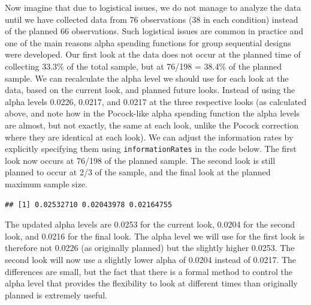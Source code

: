 \documentclass[
  oneside]{krantz}
\makeatletter
\newenvironment{Shaded}{\begin{snugshade}}{\end{snugshade}}
\newcommand{\AttributeTok}[1]{\textcolor[rgb]{0.61,0.61,0.61}{#1}}
\newcommand{\DecValTok}[1]{\textcolor[rgb]{0.06,0.06,0.06}{#1}}
\newcommand{\FloatTok}[1]{\textcolor[rgb]{0.06,0.06,0.06}{#1}}
\newcommand{\FunctionTok}[1]{\textcolor[rgb]{0,0,0}{#1}}
\newcommand{\NormalTok}[1]{#1}
\newcommand{\OtherTok}[1]{\textcolor[rgb]{0.37,0.37,0.37}{#1}}
\newcommand{\SpecialCharTok}[1]{\textcolor[rgb]{0,0,0}{#1}}
\newcommand{\StringTok}[1]{\textcolor[rgb]{0.5,0.5,0.5}{#1}}
\newenvironment{kframe}{%
\medskip{}
\setlength{\fboxsep}{.8em}
 \def\at@end@of@kframe{}%
 \ifinner\ifhmode%
  \def\at@end@of@kframe{\end{minipage}}%
  \begin{minipage}{\columnwidth}%
 \fi\fi%
 \def\FrameCommand##1{\hskip\@totalleftmargin \hskip-\fboxsep
 \colorbox{shadecolor}{##1}\hskip-\fboxsep
     \hskip-\linewidth \hskip-\@totalleftmargin \hskip\columnwidth}%
 \MakeFramed {\advance\hsize-\width
   \@totalleftmargin\z@ \linewidth\hsize
   \@setminipage}}%
 {\par\unskip\endMakeFramed%
 \at@end@of@kframe}
\renewenvironment{Shaded}{\begin{kframe}}{\end{kframe}}
\makeatother
\begin{document}
Now imagine that due to logistical issues, we do not manage to analyze the data until we have collected data from 76 observations (38 in each condition) instead of the planned 66 observations. Such logistical issues are common in practice and one of the main reasons alpha spending functions for group sequential designs were developed. Our first look at the data does not occur at the planned time of collecting 33.3\% of the total sample, but at 76/198 = 38.4\% of the planned sample. We can recalculate the alpha level we should use for each look at the data, based on the current look, and planned future looks. Instead of using the alpha levels 0.0226, 0.0217, and 0.0217 at the three respective looks (as calculated above, and note how in the Pocock-like alpha spending function the alpha levels are almost, but not exactly, the same at each look, unlike the Pocock correction where they are identical at each look). We can adjust the information rates by explicitly specifying them using \texttt{informationRates} in the code below. The first look now occurs at 76/198 of the planned sample. The second look is still planned to occur at 2/3 of the sample, and the final look at the planned maximum sample size.

\begin{Shaded}
\end{Shaded}

\begin{verbatim}
## [1] 0.02532710 0.02043978 0.02164755
\end{verbatim}

The updated alpha levels are 0.0253 for the current look, 0.0204 for the second look, and 0.0216 for the final look. The alpha level we will use for the first look is therefore not 0.0226 (as originally planned) but the slightly higher 0.0253. The second look will now use a slightly lower alpha of 0.0204 instead of 0.0217. The differences are small, but the fact that there is a formal method to control the alpha level that provides the flexibility to look at different times than originally planned is extremely useful.
\end{document}
